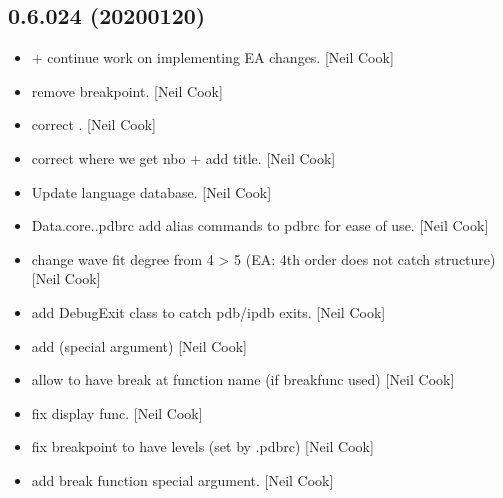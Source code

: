 \documentclass[a4paper,10pt,english]{report}
\begin{document}
\subsection{0.6.024 (2020\sphinxhyphen{}01\sphinxhyphen{}20)}
\label{\detokenize{misc/changelog:id13}}\begin{itemize}
\item {} 
 +  \sphinxhyphen{} continue work
on implementing EA changes. {[}Neil Cook{]}

\item {} 
 \sphinxhyphen{} remove breakpoint. {[}Neil Cook{]}

\item {} 
 \sphinxhyphen{} correct . {[}Neil Cook{]}

\item {} 
 \sphinxhyphen{} correct where we get nbo + add title.
{[}Neil Cook{]}

\item {} 
Update language database. {[}Neil Cook{]}

\item {} 
Data.core..pdbrc \sphinxhyphen{} add alias commands to pdbrc for ease of use. {[}Neil
Cook{]}

\item {} 
 \sphinxhyphen{} change wave fit degree
from 4 \textendash{}\textgreater{} 5 (EA: 4th order does not catch structure) {[}Neil Cook{]}

\item {} 
 \sphinxhyphen{} add DebugExit class to catch pdb/ipdb
exits. {[}Neil Cook{]}

\item {} 
 \sphinxhyphen{} add  (special argument) {[}Neil
Cook{]}

\item {} 
 \sphinxhyphen{} allow  to have break at function
name (if \textendash{}breakfunc used) {[}Neil Cook{]}

\item {} 
 \sphinxhyphen{} fix display func. {[}Neil Cook{]}

\item {} 
 \sphinxhyphen{} fix breakpoint to have levels (set
by .pdbrc) {[}Neil Cook{]}

\item {} 
 \sphinxhyphen{} add break function special argument. {[}Neil
Cook{]}

\end{itemize}
\end{document}
